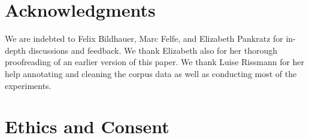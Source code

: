 \documentclass[biblatex, charis, linguex]{glossa}\usepackage{knitr}
\newcommand{\ie}{i.\,e.,\ }
\begin{document}
%
%
%
%
%
%
%

\section*{Acknowledgments}

We are indebted to Felix Bildhauer, Marc Felfe, and Elizabeth Pankratz for in-depth discussions and feedback.
We thank Elizabeth also for her thorough proofreading of an earlier version of this paper.
We thank Luise Rissmann for her help annotating and cleaning the corpus data as well as conducting most of the experiments.

\section{Ethics and Consent}
\label{sec:ethicsandconsent}
\end{document}
